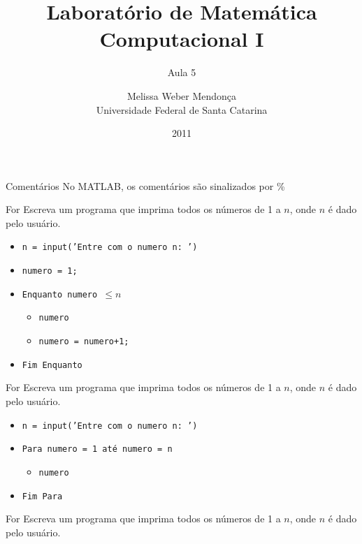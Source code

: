 \documentclass[hyperref={pdfpagelabels=false}]{beamer}
\title{Laboratório de Matemática Computacional I}
\subtitle{Aula 5}
\author[M. Weber Mendonça]{Melissa Weber Mendonça\\
Universidade Federal de Santa Catarina}
\date{2011}
\begin{document}
\setmonofont{Inconsolata}

\begin{frame}
  \titlepage
\end{frame}

\begin{frame}{Comentários}
  No MATLAB, os comentários são sinalizados por \%
\end{frame}

\begin{frame}{For}
  Escreva um programa que imprima todos os números de 1 a $n$, onde $n$ é dado pelo usuário.
  \begin{itemize}
  \item[] {\texttt{n = input('Entre com o numero n: ')}}
  \item[] {\texttt{numero = 1;}}
  \item[] {\texttt{\alert{Enquanto} numero $\leq n$}}
    \begin{itemize}
    \item[] {\texttt{numero}}
    \item[] {\texttt{numero = numero+1;}}
    \end{itemize}
  \item[] {\texttt{\alert{Fim Enquanto}}}
  \end{itemize}
\end{frame}

\begin{frame}{For}
  Escreva um programa que imprima todos os números de 1 a $n$, onde $n$ é dado pelo usuário.
  \begin{itemize}
  \item[] {\texttt{n = input('Entre com o numero n: ')}}
  \item[] {\texttt{\alert{Para} numero = 1 \alert{até} numero = n}}
    \begin{itemize}
    \item[] {\texttt{numero}}
    \end{itemize}
  \item[] {\texttt{\alert{Fim Para}}}
  \end{itemize}
\end{frame}

\begin{frame}{For}
	Escreva um programa que imprima todos os números de 1 a $n$, onde $n$ é dado pelo usuário.
	
\end{frame}
\end{document}
